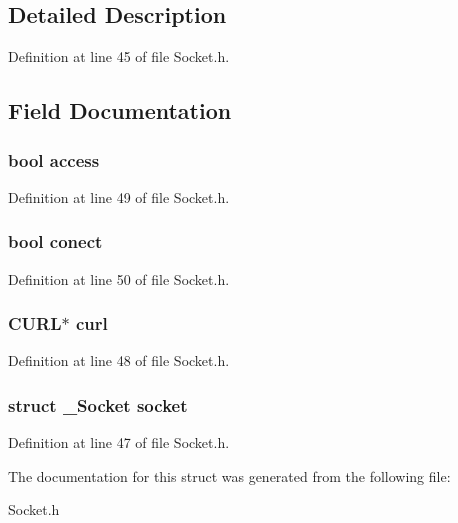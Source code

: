 \subsection{Detailed Description}


Definition at line 45 of file Socket.\-h.



\subsection{Field Documentation}
\hypertarget{structSocketExtends_ab4e2372937bb1eec89f2a954a4db6604}{
\subsubsection[{access}]{\setlength{\rightskip}{0pt plus 5cm}bool access}}\label{structSocketExtends_ab4e2372937bb1eec89f2a954a4db6604}


Definition at line 49 of file Socket.\-h.

\hypertarget{structSocketExtends_a506634736b4585cbeac7cbdefec1e540}{
\subsubsection[{conect}]{\setlength{\rightskip}{0pt plus 5cm}bool conect}}\label{structSocketExtends_a506634736b4585cbeac7cbdefec1e540}


Definition at line 50 of file Socket.\-h.

\hypertarget{structSocketExtends_a6a59594ba3469ec6a1d56f6631e275e0}{
\subsubsection[{curl}]{\setlength{\rightskip}{0pt plus 5cm}C\-U\-R\-L$\ast$ curl}}\label{structSocketExtends_a6a59594ba3469ec6a1d56f6631e275e0}


Definition at line 48 of file Socket.\-h.

\hypertarget{structSocketExtends_a6d8ff51667f3038e4e0974b8dfcb8b59}{
\subsubsection[{socket}]{\setlength{\rightskip}{0pt plus 5cm}struct {\bf \-\_\-\-Socket} socket}}\label{structSocketExtends_a6d8ff51667f3038e4e0974b8dfcb8b59}


Definition at line 47 of file Socket.\-h.



The documentation for this struct was generated from the following file\-:\begin{DoxyCompactItemize}
\item 
Socket.\-h\end{DoxyCompactItemize}
